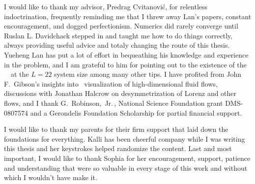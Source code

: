 
I would like to thank my advisor, Predrag Cvitanovi\'c,
for
	          {relentless indoctrination, frequently reminding me that
I threw away Lan's papers}, constant encouragement,
 and
dogged perfectionism.
%
Numerics did rarely converge until Ruslan L. Davidchack stepped in
and taught me how to do things correctly, always providing
useful advice and totaly changing the route of this thesis.
Yueheng Lan has put a lot of effort in bequeathing his knowledge
and experience in the problem, and I am grateful to him for pointing out to the
existence of the ~\eqv\ at the $L=22$ system size among many
other tips. I have
profited from John F.~Gibson's insights into \statesp\
visualization of high-dimensional fluid flows,
discussions with
Jonathan Halcrow on desymmetrization of Lorenz and other
flows, and
I thank
G.~Robinson,~Jr.\,, National Science Foundation grant
DMS-0807574 and a Gerondelis Foundation Scholarship
for partial financial support.

I would like to thank my parents for their firm support that
laid down the foundations for everything. Kalli has been cheerful company while I was
writing this thesis and her keystrokes helped randomize the content.
%
Last and most important, I would like to thank Sophia for her encouragement, support, patience and
understanding that were so valuable in every stage of this work and without which I wouldn't
have make it.
